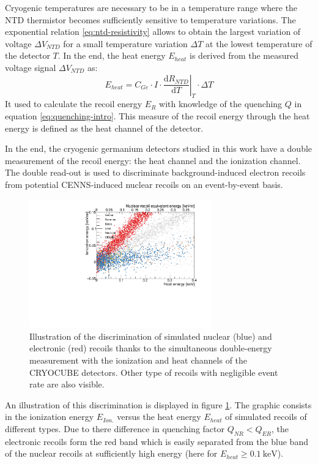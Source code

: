 Cryogenic temperatures are necessary to be in a temperature range where the NTD thermistor becomes sufficiently sensitive to temperature variations. The exponential relation \ref{eq:ntd-resistivity} allows to obtain the largest variation of voltage $\Delta V_{NTD}$ for a small temperature variation $\Delta T$ at the lowest temperature of the detector $T$.
In the end, the heat energy $E_{heat}$ is derived from the measured voltage signal $\Delta V_{NTD}$ as:
\begin{equation}
E_{heat} = C_{Ge} \cdot I \cdot
\left. \frac{\mathrm{d}R_{NTD}}{\mathrm{d}T} \right|_{T}
\cdot
\Delta T
\end{equation}
It used to calculate the recoil energy $E_R$ with knowledge of the quenching $Q$ in equation \ref{eq:quenching-intro}. This measure of the recoil energy through the heat energy is defined as the heat channel of the detector.

In the end, the cryogenic germanium detectors studied in this work have a double measurement of the recoil energy: the heat channel and the ionization channel. The double read-out is used to discriminate background-induced electron recoils from potential CENNS-induced nuclear recoils on an event-by-event basis.

\begin{figure}
\centering
\includegraphics [width=0.7\textwidth]{Figures/Experiment/discrimination_simulation.pdf}
\caption{Illustration of the discrimination of simulated nuclear (blue) and electronic (red) recoils thanks to the simultaneous double-energy measurement with the ionization and heat channels  of the CRYOCUBE detectors. Other type of recoils with negligible event rate are also visible.}
\label{fig:discrimination-simulation}
\end{figure}

An illustration of this discrimination is displayed in figure \ref{fig:discrimination-simulation}. The graphic consists in the ionization energy $E_{Ion.}$ versus the heat energy $E_{heat}$ of simulated recoils of different types. Due to there difference in quenching factor $Q_{NR} < Q_{ER}$, the electronic recoils form the red band which is easily separated from the blue band of the nuclear recoils at sufficiently high energy (here for $E_{heat} \geq \SI{0.1}{\kilo\eV}$).  

